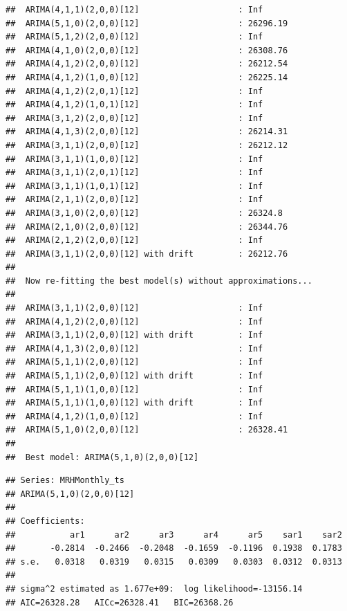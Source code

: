 \documentclass[12pt,]{article}
\begin{document}
\begin{verbatim}
##  ARIMA(4,1,1)(2,0,0)[12]                    : Inf
##  ARIMA(5,1,0)(2,0,0)[12]                    : 26296.19
##  ARIMA(5,1,2)(2,0,0)[12]                    : Inf
##  ARIMA(4,1,0)(2,0,0)[12]                    : 26308.76
##  ARIMA(4,1,2)(2,0,0)[12]                    : 26212.54
##  ARIMA(4,1,2)(1,0,0)[12]                    : 26225.14
##  ARIMA(4,1,2)(2,0,1)[12]                    : Inf
##  ARIMA(4,1,2)(1,0,1)[12]                    : Inf
##  ARIMA(3,1,2)(2,0,0)[12]                    : Inf
##  ARIMA(4,1,3)(2,0,0)[12]                    : 26214.31
##  ARIMA(3,1,1)(2,0,0)[12]                    : 26212.12
##  ARIMA(3,1,1)(1,0,0)[12]                    : Inf
##  ARIMA(3,1,1)(2,0,1)[12]                    : Inf
##  ARIMA(3,1,1)(1,0,1)[12]                    : Inf
##  ARIMA(2,1,1)(2,0,0)[12]                    : Inf
##  ARIMA(3,1,0)(2,0,0)[12]                    : 26324.8
##  ARIMA(2,1,0)(2,0,0)[12]                    : 26344.76
##  ARIMA(2,1,2)(2,0,0)[12]                    : Inf
##  ARIMA(3,1,1)(2,0,0)[12] with drift         : 26212.76
## 
##  Now re-fitting the best model(s) without approximations...
## 
##  ARIMA(3,1,1)(2,0,0)[12]                    : Inf
##  ARIMA(4,1,2)(2,0,0)[12]                    : Inf
##  ARIMA(3,1,1)(2,0,0)[12] with drift         : Inf
##  ARIMA(4,1,3)(2,0,0)[12]                    : Inf
##  ARIMA(5,1,1)(2,0,0)[12]                    : Inf
##  ARIMA(5,1,1)(2,0,0)[12] with drift         : Inf
##  ARIMA(5,1,1)(1,0,0)[12]                    : Inf
##  ARIMA(5,1,1)(1,0,0)[12] with drift         : Inf
##  ARIMA(4,1,2)(1,0,0)[12]                    : Inf
##  ARIMA(5,1,0)(2,0,0)[12]                    : 26328.41
## 
##  Best model: ARIMA(5,1,0)(2,0,0)[12]
\end{verbatim}

\begin{verbatim}
## Series: MRHMonthly_ts 
## ARIMA(5,1,0)(2,0,0)[12] 
## 
## Coefficients:
##           ar1      ar2      ar3      ar4      ar5    sar1    sar2
##       -0.2814  -0.2466  -0.2048  -0.1659  -0.1196  0.1938  0.1783
## s.e.   0.0318   0.0319   0.0315   0.0309   0.0303  0.0312  0.0313
## 
## sigma^2 estimated as 1.677e+09:  log likelihood=-13156.14
## AIC=26328.28   AICc=26328.41   BIC=26368.26
\end{verbatim}
\end{document}
